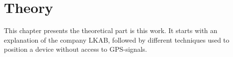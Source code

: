 \chapter{Theory}\label{theory}
This chapter presents the theoretical part is this work.
It starts with an explanation of the company LKAB, followed by 
different techniques used to position a device without access to GPS-signals.








